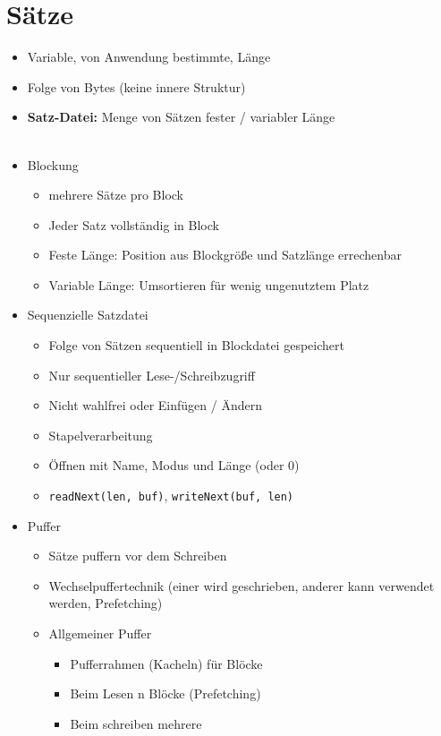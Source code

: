 \documentclass[11pt, paper=a4, twocolumn]{scrartcl}
\begin{document}
	\section{Sätze}
		\begin{itemize}
			\item Variable, von Anwendung bestimmte, Länge 
			\item Folge von Bytes (keine innere Struktur)
			\item \textbf{Satz-Datei:} Menge von Sätzen fester / variabler 
				Länge\\~
			\item Blockung
				\begin{itemize}
					\item mehrere Sätze pro Block
					\item Jeder Satz vollständig in Block
					\item Feste Länge: Position aus Blockgröße und 
						Satzlänge errechenbar
					\item Variable Länge: Umsortieren für wenig 
						ungenutztem Platz 
				\end{itemize}
			\item Sequenzielle Satzdatei
				\begin{itemize}
					\item Folge von Sätzen sequentiell in Blockdatei 
						gespeichert
					\item Nur sequentieller Lese-/Schreibzugriff
					\item Nicht wahlfrei oder Einfügen / Ändern
					\item Stapelverarbeitung
					\item Öffnen mit Name, Modus und Länge (oder 0)
					\item \texttt{readNext(len, buf)}, 
						\texttt{writeNext(buf, len)}
				\end{itemize}
			\item Puffer
				\begin{itemize}
					\item Sätze puffern vor dem Schreiben
					\item Wechselpuffertechnik (einer wird 
						geschrieben, anderer kann verwendet 
						werden, Prefetching)
					\item Allgemeiner Puffer
						\begin{itemize}
							\item Pufferrahmen (Kacheln) für 
								Blöcke
							\item Beim Lesen n Blöcke 
								(Prefetching)
							\item Beim schreiben mehrere 

\end{itemize}
\end{itemize}
\end{itemize}
\end{document}
